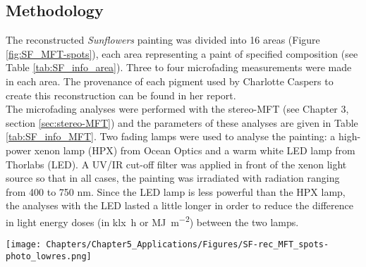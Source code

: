 \subsection{Methodology}


The reconstructed \textit{Sunflowers} painting was divided into 16 areas (Figure \ref{fig:SF_MFT-spots}), each area representing a paint of specified composition  (see Table \ref{tab:SF_info_area}). Three to four microfading measurements were made in each area. The provenance of each pigment used by Charlotte Caspers to create this reconstruction can be found in her report.\\

The microfading analyses were performed with the stereo-MFT (see Chapter 3, section \ref{sec:stereo-MFT}) and the parameters of these analyses are given in Table \ref{tab:SF_info_MFT}. Two fading lamps were used to analyse the painting: a high-power xenon lamp (HPX) from Ocean Optics and a warm white LED lamp from Thorlabs (LED). A UV/IR cut-off filter was applied in front of the xenon light source so that in all cases, the painting was irradiated with radiation ranging from 400 to 750 nm. Since the LED lamp is less powerful than the HPX lamp, the analyses with the LED lasted a little longer in order to reduce the difference in light energy doses (in \unit{\kilo\lux\hour} or \unit{\mega\joule\per\square\metre}) between the two lamps. 

\begin{figure*}[!h]
\centering
\texttt{[image: Chapters/Chapter5\_Applications/Figures/SF-rec\_MFT\_spots-photo\_lowres.png]}
\caption[\hspace{0.3cm}Micro-fading spots on the \textit{Sunflowers} reconstruction]{Location of the microfading analyses on the Sunflowers reconstruction (a) ; photograph showing the Sunflowers reconstruction painting being analysed with the stereo-MFT (b).}
\label{fig:SF_MFT-spots}
\end{figure*}






